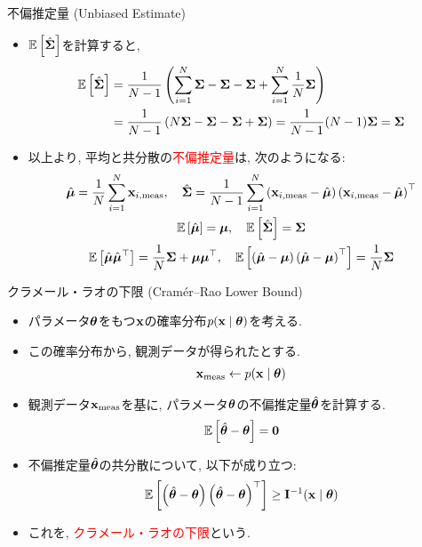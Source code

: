 \documentclass[dvipdfmx,notheorems,t]{beamer}
\begin{document}
\begin{frame}{不偏推定量 (Unbiased Estimate)}
\begin{itemize}
  \item $\operatorname{\mathbb{E}} \left[ \hat{\vb*{\Sigma}} \right]$を計算すると,
  \begin{align*}
    \operatorname{\mathbb{E}} \left[ \hat{\vb*{\Sigma}} \right] &= \frac{1}{N - 1} \left(
      \sum_{i = 1}^N \vb{\Sigma} - \vb{\Sigma} - \vb{\Sigma} + \sum_{i = 1}^N \frac{1}{N} \vb{\Sigma} \right) \\
    &= \frac{1}{N - 1} \left( N \vb{\Sigma} - \vb{\Sigma} - \vb{\Sigma} + \vb{\Sigma} \right)
    = \frac{1}{N - 1} (N - 1) \vb{\Sigma} = \vb{\Sigma}
  \end{align*}
  \item 以上より, 平均と共分散の\textcolor{red}{不偏推定量}は, 次のようになる:
  \begin{gather*}
    \hat{\vb*{\mu}} = \frac{1}{N} \sum_{i = 1}^N \vb{x}_{i, \mathrm{meas}}, \quad
    \hat{\vb{\Sigma}} = \frac{1}{N - 1} \sum_{i = 1}^N
      \left( \vb{x}_{i, \mathrm{meas}} - \hat{\vb*{\mu}} \right)
      \left( \vb{x}_{i, \mathrm{meas}} - \hat{\vb*{\mu}} \right)^\top \\
    \operatorname{\mathbb{E}} \left[ \hat{\vb*{\mu}} \right] = \vb*{\mu}, \quad
    \operatorname{\mathbb{E}} \left[ \hat{\vb{\Sigma}} \right] = \vb{\Sigma} \\
    \operatorname{\mathbb{E}} \left[ \hat{\vb*{\mu}} \hat{\vb*{\mu}}^\top \right] = \frac{1}{N} \vb{\Sigma} + \vb*{\mu} \vb*{\mu}^\top, \quad
    \operatorname{\mathbb{E}} \left[ \left( \hat{\vb*{\mu}} - \vb*{\mu} \right)
      \left( \hat{\vb*{\mu}} - \vb*{\mu} \right)^\top \right] = \frac{1}{N} \vb{\Sigma}
  \end{gather*}
\end{itemize}
\end{frame}

\begin{frame}{クラメール・ラオの下限 (Cramér--Rao Lower Bound)}
\begin{itemize}
  \item パラメータ$\vb*{\theta}$をもつ$\vb{x}$の確率分布$p(\vb{x} \mid \vb*{\theta})$を考える.
  \item この確率分布から, 観測データが得られたとする.
  \begin{align*}
    \vb{x}_\mathrm{meas} \gets p(\vb{x} \mid \vb*{\theta})
  \end{align*}
  \item 観測データ$\vb{x}_\mathrm{meas}$を基に,
  パラメータ$\vb*{\theta}$の不偏推定量$\hat{\vb*{\theta}}$を計算する.
  \begin{align*}
    \operatorname{\mathbb{E}} \left[ \hat{\vb*{\theta}} - \vb*{\theta} \right] = \vb{0}
  \end{align*}
  \item 不偏推定量$\hat{\vb*{\theta}}$の共分散について, 以下が成り立つ:
  \begin{align*}
    \operatorname{\mathbb{E}} \left[ \left( \hat{\vb*{\theta}} - \vb*{\theta} \right)
      \left( \hat{\vb*{\theta}} - \vb*{\theta} \right)^\top \right] \ge \vb{I}^{-1}(\vb{x} \mid \vb*{\theta})
  \end{align*}
  \item これを, \textcolor{red}{クラメール・ラオの下限}という.
\end{itemize}
\end{frame}
\end{document}
